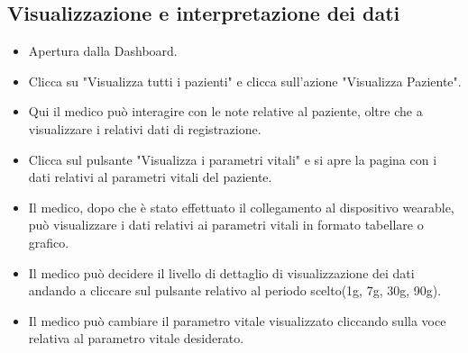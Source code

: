 \documentclass[12pt,a4paper,oneside]{report}
\begin{document}
\subsection{Visualizzazione e interpretazione dei dati}
\begin{itemize}
  \item Apertura dalla Dashboard.
    \item Clicca su "Visualizza tutti i pazienti" e clicca sull'azione "Visualizza Paziente".
  \item Qui il medico può interagire con le note relative al paziente, oltre che a visualizzare i relativi dati di registrazione.
    \item Clicca sul pulsante "Visualizza i parametri vitali" e si apre la pagina con i dati relativi al parametri vitali del paziente.
    \item Il medico, dopo che è stato effettuato il collegamento al dispositivo wearable, può visualizzare i dati relativi ai parametri vitali in formato tabellare o grafico.
    \item Il medico può decidere il livello di dettaglio di visualizzazione dei dati andando a cliccare sul pulsante relativo al periodo scelto(1g, 7g, 30g, 90g).
    \item Il medico può cambiare il parametro vitale visualizzato cliccando sulla voce relativa al parametro vitale desiderato.
\end{itemize}
\end{document}
